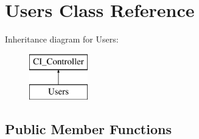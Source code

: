 \hypertarget{class_users}{}\section{Users Class Reference}
\label{class_users}
Inheritance diagram for Users\+:\begin{figure}[H]
\begin{center}
\leavevmode
\includegraphics[height=2.000000cm]{class_users}
\end{center}
\end{figure}
\subsection*{Public Member Functions}
